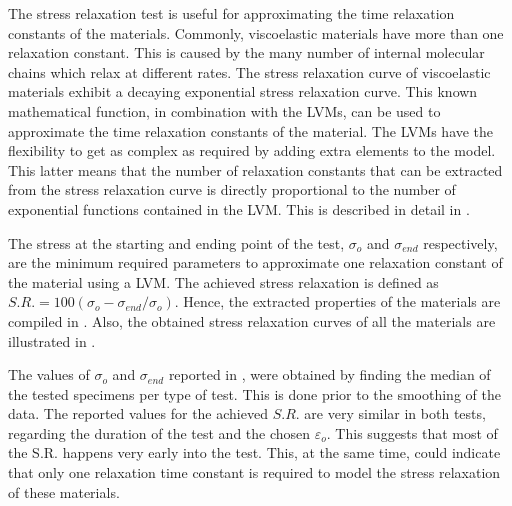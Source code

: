 The stress relaxation test is useful for approximating the time relaxation constants of the materials. Commonly, viscoelastic materials have more than one relaxation constant. This is caused by the many number of internal molecular chains which relax at different rates. The stress relaxation curve of viscoelastic materials exhibit a decaying exponential stress relaxation curve. This known mathematical function, in combination with the LVMs, can be used to approximate the time relaxation constants of the material. The LVMs have the flexibility to get as complex as required by adding extra elements to the model. This latter means that the number of relaxation constants that can be extracted from the stress relaxation curve is directly proportional to the number of exponential functions contained in the LVM. This is described in detail in .

The stress at the starting and ending point of the test,  $\sigma_o$ and $\sigma_{end}$ respectively, are the minimum required parameters to approximate one relaxation constant of the material using a LVM. The achieved stress relaxation is defined as $S.R. = 100(\sigma_o - \sigma_{end}/\sigma_o)$. Hence, the extracted properties of the materials are compiled in . Also, the obtained stress relaxation curves of all the materials are illustrated in .

The values of $\sigma_o$ and $\sigma_{end}$ reported in , were obtained by finding the median of the tested specimens per type of test. This is done prior to the smoothing of the data. The reported values for the achieved $S.R.$ are very similar in both tests, regarding the duration of the test and the chosen $\varepsilon_o$. This suggests that most of the S.R. happens very early into the test. This, at the same time, could indicate that only one relaxation time constant is required to model the stress relaxation of these materials.

